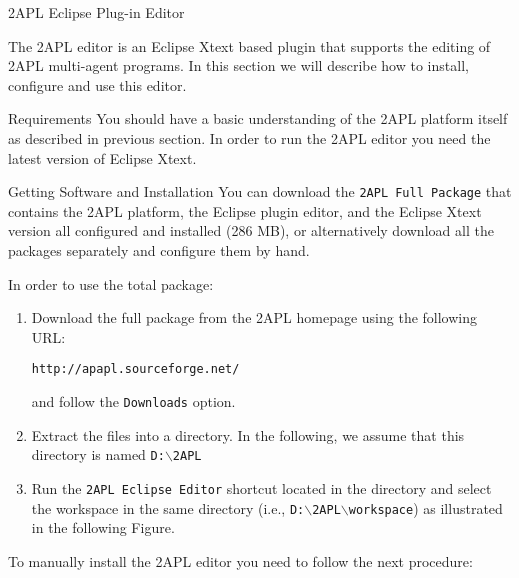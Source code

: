 \begin{chapter}{2APL Eclipse Plug-in Editor} \label{chap:eclipse}

The 2APL editor is an Eclipse Xtext based plugin that supports the
editing of 2APL multi-agent programs. In this section we will
describe how to install, configure and use this editor.

\begin{section}{Requirements}
You should have a basic understanding of the 2APL platform itself as
described in previous section. In order to run the 2APL editor you
need the latest version of Eclipse Xtext.
\end{section}

\begin{section}{Getting Software and Installation}
You can download the {\tt 2APL Full Package} that contains the 2APL
platform, the Eclipse plug\-in editor, and the Eclipse Xtext version
all configured and installed (286 MB), or alternatively download all
the packages separately and configure them by hand.

In order to use the total package:
\begin{enumerate}

    \item Download the full package from the 2APL homepage using the
    following URL:
    \begin{center}
    {\tt http://apapl.sourceforge.net/}
    \end{center}
    and follow the {\tt Downloads} option.

    \item Extract the files into a directory. In the following, we assume that this directory is named \texttt{D:$\backslash$2APL}

    \item Run the \texttt{2APL Eclipse Editor} shortcut located in the
    directory and select the workspace in the same directory (i.e.,
    \texttt{D:$\backslash$2APL$\backslash$workspace}) as illustrated in the following
    Figure.
        \begin{figure}[ht]
            \begin{center}
            \end{center}\label{fig:workspace}
        \end{figure}
\end{enumerate}

To manually install the 2APL editor you need to follow the next
procedure:


\end{section}
\end{chapter}

